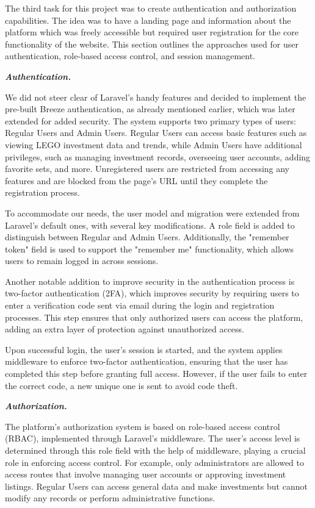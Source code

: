 \documentclass[letterpaper,twocolumn]{article}
\newcommand{\myparagraph}[1]{\vspace{0.1cm}\noindent \textbf{\textit{#1.}}}
\begin{document}
The third task for this project was to create authentication and authorization capabilities. The idea was to have a landing page and information about the platform which was freely accessible but required user registration for the core functionality of the website. This section outlines the approaches used for user authentication, role-based access control, and session management.

\myparagraph{Authentication}

We did not steer clear of Laravel's handy features and decided to implement the pre-built Breeze authentication, as already mentioned earlier, which was later extended for added security. The system supports two primary types of users: Regular Users and Admin Users. Regular Users can access basic features such as viewing LEGO investment data and trends, while Admin Users have additional privileges, such as managing investment records, overseeing user accounts, adding favorite sets, and more. Unregistered users are restricted from accessing any features and are blocked from the page’s URL until they complete the registration process.

To accommodate our needs, the user model and migration were extended from Laravel's default ones, with several key modifications. A role field is added to distinguish between Regular and Admin Users. Additionally, the "remember token" field is used to support the "remember me" functionality, which allows users to remain logged in across sessions.

Another notable addition to improve security in the authentication process is two-factor authentication (2FA), which improves security by requiring users to enter a verification code sent via email during the login and registration processes. This step ensures that only authorized users can access the platform, adding an extra layer of protection against unauthorized access.

Upon successful login, the user’s session is started, and the system applies middleware to enforce two-factor authentication, ensuring that the user has completed this step before granting full access. However, if the user fails to enter the correct code, a new unique one is sent to avoid code theft.

\myparagraph{Authorization}

The platform’s authorization system is based on role-based access control (RBAC), implemented through Laravel’s middleware. The user's access level is determined through this role field with the help of middleware, playing a crucial role in enforcing access control. For example, only administrators are allowed to access routes that involve managing user accounts or approving investment listings. Regular Users can access general data and make investments but cannot modify any records or perform administrative functions.
\end{document}
